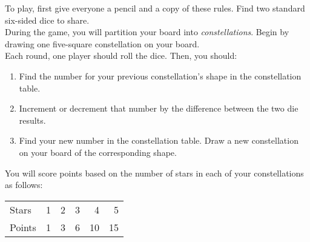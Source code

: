 \begin{minipage}{6cm}\raggedright

\setmainfont[Scale=0.95]{Tex Gyre Schola}

To play, first give everyone a pencil and a copy of these rules. Find two standard six-sided dice to share.\\[1.0ex]

During the game, you will partition your board into \emph{constellations}. Begin by drawing one five-square constellation on your board.\\[1.0ex]

Each round, one player should roll the dice.  Then, you should:
\begin{enumerate}[leftmargin=*]
\vspace{-0.7ex}
\item Find the number for your previous constellation's shape in the constellation table.%
\vspace{-0.7ex}
\item Increment or decrement that number by the difference between the two die results.%
\vspace{-0.7ex}
\item Find your new number in the constellation table. Draw a new constellation on your board of the corresponding shape.%
\end{enumerate}



You will score points based on the number of stars in each of your constellations as follows:
\begin{center}
{
\small
\begin{tabular}{lrrrrr} \toprule
Stars & 1 & 2 & 3 & 4 & 5 \\
Points & \phantom{1}1 & \phantom{1}3 & \phantom{1}6 & 10 & 15 \\\bottomrule
\end{tabular}
}
\end{center}


\end{minipage}
